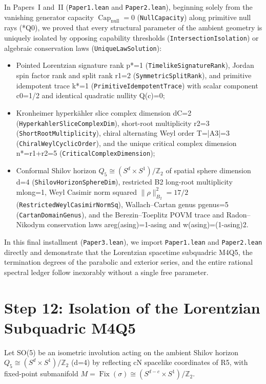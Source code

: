 \documentclass[11pt,reqno]{amsart}
\theoremstyle{definition}
\theoremstyle{remark}
\newcommand{\CapNull}{\operatorname{Cap}_{\mathrm{null}}}
\newcommand{\Fix}{\operatorname{Fix}}
\begin{document}
In Papers~I and~II (\texttt{Paper1.lean} and \texttt{Paper2.lean}), beginning solely from the vanishing generator capacity $\CapNull = 0$ (\texttt{NullCapacity}) along primitive null rays (*Q0), we proved that every structural parameter of the ambient geometry is uniquely isolated by opposing capability thresholds (\texttt{IntersectionIsolation}) or algebraic conservation laws (\texttt{UniqueLawSolution}):
\begin{itemize}
  \item Pointed Lorentzian signature rank p*=1 (\texttt{TimelikeSignatureRank}), Jordan spin factor rank and split rank r1=2 (\texttt{SymmetricSplitRank}), and primitive idempotent trace k*=1 (\texttt{PrimitiveIdempotentTrace}) with scalar component c0=1/2 and identical quadratic nullity Q(c)=0;
  \item Kronheimer hyperk\"ahler slice complex dimension dC=2 (\texttt{HyperkahlerSliceComplexDim}), short-root multiplicity r2=3 (\texttt{ShortRootMultiplicity}), chiral alternating Weyl order T=|A3|=3 (\texttt{ChiralWeylCyclicOrder}), and the unique critical complex dimension n*=r1+r2=5 (\texttt{CriticalComplexDimension});
  \item Conformal Shilov horizon $Q_5 \cong (S^d \times S^1)/\mathbb{Z}_2$ of spatial sphere dimension d=4 (\texttt{ShilovHorizonSphereDim}), restricted B2 long-root multiplicity mlong=1, Weyl Casimir norm squared $\|\rho\|_{B_2}^2 = 17/2$ (\texttt{RestrictedWeylCasimirNormSq}), Wallach--Cartan genus pgenus=5 (\texttt{CartanDomainGenus}), and the Berezin--Toeplitz POVM trace and Radon--Nikodym conservation laws areg(asing)=1-asing and w(asing)=(1-asing)2.
\end{itemize}

In this final installment (\texttt{Paper3.lean}), we import \texttt{Paper1.lean} and \texttt{Paper2.lean} directly and demonstrate that the Lorentzian spacetime subquadric M4Q5, the termination degrees of the parabolic and exterior series, and the entire rational spectral ledger follow inexorably without a single free parameter.

\section{Step 12: Isolation of the Lorentzian Subquadric \texorpdfstring{M4Q5}{M4 in Q5}}

Let SO(5) be an isometric involution acting on the ambient Shilov horizon $Q_5 \cong (S^d \times S^1)/\mathbb{Z}_2$ (d=4) by reflecting cN spacelike coordinates of R5, with fixed-point submanifold $M = \Fix(\sigma) \cong (S^{d-c} \times S^1)/\mathbb{Z}_2$.
\end{document}
